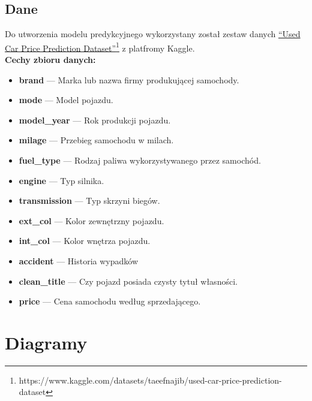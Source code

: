 \documentclass[12pt, a4paper]{report}
\begin{document}
\section{Dane}
Do utworzenia modelu predykcyjnego wykorzystany został zestaw danych
 \href{https://www.kaggle.com/datasets/taeefnajib/used-car-price-prediction-dataset}{``Used Car Price Prediction Dataset''}\footnote{https://www.kaggle.com/datasets/taeefnajib/used-car-price-prediction-dataset}
  z platfromy Kaggle. \\[1cm]
\textbf{Cechy zbioru danych:}
\begin{itemize}
    \item \textbf{brand} --- Marka lub nazwa firmy produkującej samochody.
    \item \textbf{mode} --- Model pojazdu.
    \item \textbf{model\_year} --- Rok produkcji pojazdu.
    \item \textbf{milage} --- Przebieg samochodu w milach.
    \item \textbf{fuel\_type} --- Rodzaj paliwa wykorzystywanego przez samochód.
    \item \textbf{engine} --- Typ silnika.
    \item \textbf{transmission} --- Typ skrzyni biegów.
    \item \textbf{ext\_col} --- Kolor zewnętrzny pojazdu.
    \item \textbf{int\_col} --- Kolor wnętrza pojazdu.
    \item \textbf{accident} --- Historia wypadków
    \item \textbf{clean\_title} --- Czy pojazd posiada czysty tytuł własności.
    \item \textbf{price} --- Cena samochodu według sprzedającego.
\end{itemize}

\chapter{Diagramy}
\end{document}
